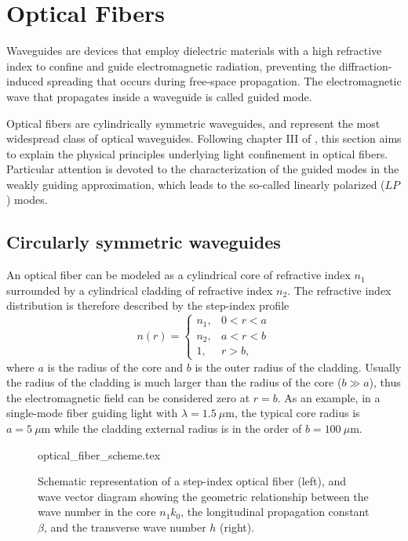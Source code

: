 \section{Optical Fibers}\label{sec:Optical_fibers}
Waveguides are devices that employ dielectric materials with a high refractive index to confine and guide electromagnetic radiation, preventing the diffraction-induced spreading that occurs during free-space propagation. The electromagnetic wave that propagates inside a waveguide is called guided mode.

Optical fibers are cylindrically symmetric waveguides, and represent the most widespread class of optical waveguides. Following chapter III of \citeauthor*{yariv2007photonics} \cite{yariv2007photonics}, this section aims to explain the physical principles underlying light confinement in optical fibers. Particular attention is devoted to the characterization of the guided modes in the weakly guiding approximation, which leads to the so-called linearly polarized ($LP$) modes.

\subsection{Circularly symmetric waveguides}
An optical fiber can be modeled as a cylindrical core of refractive index $n_1$ surrounded by a cylindrical cladding of refractive index $n_2$. The refractive index distribution is therefore described by the step-index profile
\begin{equation}
    n(r)=
    \begin{cases}
        n_1, & 0 < r < a \\
        n_2, & a < r < b \\
        1,   & r > b,
    \end{cases}
\end{equation}
where $a$ is the radius of the core and $b$ is the outer radius of the cladding. Usually the radius of the cladding is much larger than the radius of the core ($b\gg a$), thus the electromagnetic field can be considered zero at $r=b$. As an example, in a single-mode fiber guiding light with $\lambda=1.5~\mu\mathrm{m}$, the typical core radius is $a=5~\mu\mathrm{m}$ while the cladding external radius is in the order of $b=100~\mu\mathrm{m}$.

\begin{figure}[t]
    \centering
    {optical_fiber_scheme.tex}
    \caption{Schematic representation of a step-index optical fiber (left), and wave vector diagram showing the geometric relationship between the wave number in the core $n_1 k_0$, the longitudinal propagation constant $\beta$, and the transverse wave number $h$ (right).}
    \label{fig:optical_fiber_scheme}
\end{figure}

